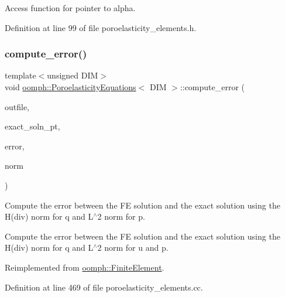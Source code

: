 Access function for pointer to alpha. 



Definition at line 99 of file poroelasticity\+\_\+elements.\+h.

\mbox{\label{classoomph_1_1PoroelasticityEquations_a9ad9413383820342f2c5a967c4bf4e94}} 
\subsubsection{\texorpdfstring{compute\+\_\+error()}{compute\_error()}\hspace{0.1cm}{\footnotesize\ttfamily [1/2]}}
{\footnotesize\ttfamily template$<$unsigned D\+IM$>$ \\
void \hyperlink{classoomph_1_1PoroelasticityEquations}{oomph\+::\+Poroelasticity\+Equations}$<$ D\+IM $>$\+::compute\+\_\+error (\begin{DoxyParamCaption}\item[{std\+::ostream \&}]{outfile,  }\item[{\hyperlink{classoomph_1_1FiniteElement_a690fd33af26cc3e84f39bba6d5a85202}{Finite\+Element\+::\+Steady\+Exact\+Solution\+Fct\+Pt}}]{exact\+\_\+soln\+\_\+pt,  }\item[{\hyperlink{classoomph_1_1Vector}{Vector}$<$ double $>$ \&}]{error,  }\item[{\hyperlink{classoomph_1_1Vector}{Vector}$<$ double $>$ \&}]{norm }\end{DoxyParamCaption})\hspace{0.3cm}{\ttfamily [virtual]}}



Compute the error between the FE solution and the exact solution using the H(div) norm for q and L$^\wedge$2 norm for p. 

Compute the error between the FE solution and the exact solution using the H(div) norm for q and L$^\wedge$2 norm for u and p. 

Reimplemented from \hyperlink{classoomph_1_1FiniteElement_a745d818aa291fe61538117c5f6c2b294}{oomph\+::\+Finite\+Element}.



Definition at line 469 of file poroelasticity\+\_\+elements.\+cc.



